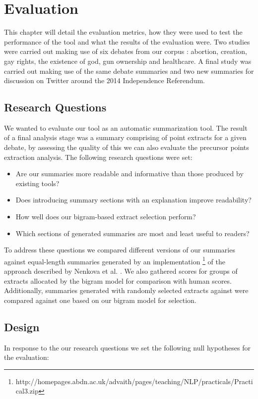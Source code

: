 \chapter{Evaluation\label{chap:evaluation}}
  This chapter will detail the evaluation metrics, how they were used to test the performance of the tool and what the results of the evaluation were. Two studies were carried out making use of six debates from our corpus \cite{walker2012corpus}: abortion, creation, gay rights, the existence of god, gun ownership and healthcare. A final study was carried out making use of the same debate summaries and two new summaries for discussion on Twitter around the 2014 Independence Referendum.

  \section{Research Questions}
    We wanted to evaluate our tool as an automatic summarization tool. The result of a final analysis stage was a summary comprising of point extracts for a given debate, by assessing the quality of this we can also evaluate the precursor points extraction analysis. The following research questions were set:

    \begin{itemize}
      \item{Are our summaries more readable and informative than those produced by existing tools?}
      \item{Does introducing summary sections with an explanation improve readability?}
      \item{How well does our bigram-based extract selection perform?}
      \item{Which sections of generated summaries are most and least useful to readers?}
    \end{itemize}

    To address these questions we compared different versions of our summaries against equal-length summaries generated by an implementation \footnote{http://homepages.abdn.ac.uk/advaith/pages/teaching/NLP/practicals/Practical3.zip} of the approach described by Nenkova et al. \cite{nenkova2006compositional}. We also gathered scores for groups of extracts allocated by the bigram model for comparison with human scores. Additionally, summaries generated with randomly selected extracts against were compared against one based on our bigram model for selection.

  \section{Design}
    In response to the our research questions we set the following null hypotheses for the evaluation:

